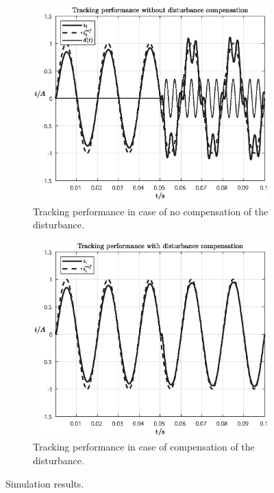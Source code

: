 \documentclass[11pt,a4paper,oneside]{book}
\numberwithin{equation}{section}
\theoremstyle{it}
\theoremstyle{definition}
\begin{document}
\begin{figure}[H]
	\centering
	\begin{subfigure}{.5\textwidth}
		\centering
		\includegraphics[width = 260pt, angle = 0, 
		keepaspectratio]{figures/single_phase_inverter/tracks_nocomp.eps}
		\captionsetup{width=0.5\textwidth, font=small}		
		\caption{Tracking performance in case of no compensation of the 
			disturbance.}
		\label{figure_res_nocomp}
	\end{subfigure}%
	\begin{subfigure}{.5\textwidth}
		\centering
		\includegraphics[width = 260pt, angle = 0, 
		keepaspectratio]{figures/single_phase_inverter/tracks.eps}
		\captionsetup{width=0.5\textwidth, font=small}		
		\caption{Tracking performance in case of compensation of the 
			disturbance.}
		\label{figure_res_comp}
	\end{subfigure}
	\caption{Simulation results.}
	\label{}
\end{figure}
\end{document}
